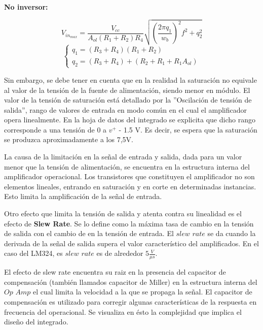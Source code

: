 \textbf{No inversor:}

\begin{equation} \label{eq:sat2}
    V_{in_{max}}=\frac{V_{cc}}{A_{ol}(R_{1}+R_{2})R_{4}}\sqrt{(\frac{2\pi q_{1}}{w_{b}})^{2}f^{2}+q_{2}^{2}}
\end{equation}
\begin{equation}
\left\{\begin{matrix}
q_{1}=(R_{3}+R_{4})(R_{1}+R_{2})
\\ 
q_{2}=(R_{3}+R_{4})+(R_{2}+R_{1}+R_{1}A_{ol})
\end{matrix}\right.
\end{equation}


Sin embargo, se debe tener en cuenta que en la realidad la saturación no equivale al valor de la tensión de la fuente de alimentación, siendo menor en módulo. El valor de la tensión de saturación está detallado por la ''Oscilación de tensión de salida'', rango de valores de entrada en modo común en el cual el amplificador opera linealmente. En la hoja de datos del integrado se explicita que dicho rango corresponde a una tensión de 0 a $v^{+}$ - 1.5 V. Es decir, se espera que la saturación se produzca aproximadamente a los 7,5V.

La causa de la limitación en la señal de entrada y salida, dada para un valor menor que la tensión de alimentación, se encuentra en la estructura interna del amplificador operacional. Los transistores que constituyen el amplificador no son elementos lineales, entrando en saturación y en corte en determinadas instancias. Esto limita la amplificación de la señal de entrada. 

Otro efecto que limita la tensión de salida y atenta contra su linealidad es el efecto de \textbf{Slew Rate}. Se lo define como la máxima tasa de cambio en la tensión de salida con el cambio de en la tensión de entrada. El $slew$ $rate$ se da cuando la derivada de la señal de salida supera el valor característico del amplificados. En el caso del LM324, es $slew$ $rate$ es de alrededor $5\frac{V}{\mu s}$. 

El efecto de slew rate encuentra su raiz en la presencia del capacitor de compensación (también llamados capacitor de Miller) en la estructura interna del $Op$ $Amp$ el cual limita la velocidad a la que se propaga la señal. El capacitor de compensación es utilizado para corregir algunas características de la respuesta en frecuencia del operacional. Se visualiza en ésto la complejidad que implica el diseño del integrado. 

